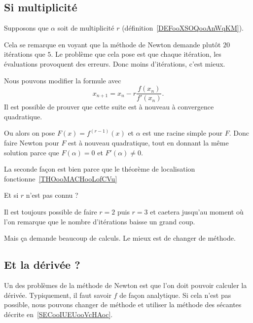 \subsection{Si multiplicité}

Supposons que \( \alpha\) soit de multiplicité \( r\) (définition~\ref{DEFooXSOQooAnWqKM}).

Cela se remarque en voyant que la méthode de Newton demande plutôt \( 20\) itérations que \( 5\). Le problème que cela pose est que chaque itération, les évaluations provoquent des erreurs. Donc moins d'itérations, c'est mieux.

Nous pouvons modifier la formule avec
\begin{equation}
    x_{n+1}=x_n-r\frac{ f(x_n) }{ f'(x_n) }.
\end{equation}
Il est possible de prouver que cette suite est à nouveau à convergence quadratique.

Ou alors on pose \( F(x)=f^{(r-1)}(x)\) et \( \alpha\) est une racine simple pour \( F\). Donc faire Newton pour \( F\) est à nouveau quadratique, tout en donnant la même solution parce que \( F(\alpha)=0\) et \( F'(\alpha)\neq 0\).

La seconde façon est bien parce que le théorème de localisation fonctionne~\ref{THOooMACHooLofCVu}

Et si \( r\) n'est pas connu ?

Il est toujours possible de faire \( r=2\) puis \( r=3\) et caetera jusqu'au moment où l'on remarque que le nombre d'itérations baisse un grand coup.

Mais ça demande beaucoup de calculs.  Le mieux est de changer de méthode.

\subsection{Et la dérivée ?}

Un des problèmes de la méthode de Newton est que l'on doit pouvoir calculer la dérivée. Typiquement, il faut savoir \( f\) de façon analytique. Si cela n'est pas possible, nous pouvons changer de méthode et utiliser la méthode des sécantes décrite en~\ref{SECooIUEUooVcHAoc}.


